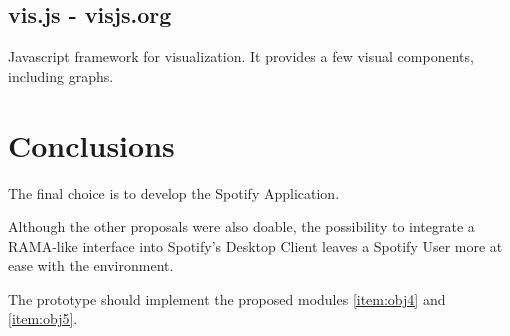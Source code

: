
  \subsection{vis.js - visjs.org} %
  \label{sub:visjs}
    Javascript framework for visualization.
    It provides a few visual components, including graphs.

\section{Conclusions}

  The final choice is to develop the Spotify Application.

  Although the other proposals were also doable, the possibility to integrate a RAMA-like interface into Spotify's Desktop Client leaves a Spotify User more at ease with the environment.

  The prototype should implement the proposed modules \ref{item:obj4} and \ref{item:obj5}.